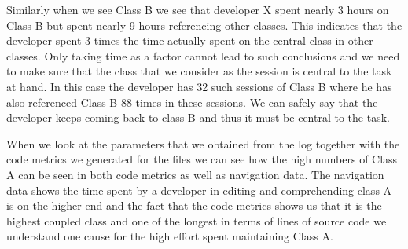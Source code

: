 Similarly when we see Class B we see that developer X spent nearly 3 hours on Class B but spent nearly 9 hours referencing other classes. This indicates that the developer spent 3 times the time actually spent on the central class in other classes. Only taking time as a factor cannot lead to such conclusions and we need to make sure that the class that we consider as the session is central to the task at hand. In this case the developer has 32 such sessions of Class B where he has also referenced Class B 88 times in these sessions. We can safely say that the developer keeps coming back to class B and thus it must be central to the task. 
%

When we look at the parameters that we obtained from the log together with the code metrics we generated for the files we can see how the high numbers of Class A can be seen in both code metrics as well as navigation data. The navigation data shows the time spent by a developer in editing and comprehending class A is on the higher end and the fact that the code metrics shows us that it is the highest coupled class and one of the longest in terms of lines of source code we understand one cause for the high effort spent maintaining Class A.
